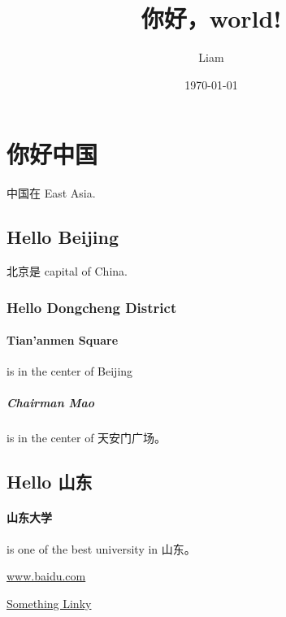\documentclass[UTF8]{ctexart}
\title{你好，world!}
\author{Liam}
\date{\today}
\begin{document}
    \maketitle
    \tableofcontents %
    \section{你好中国}
    中国在 East Asia.
    \subsection{Hello Beijing}
    北京是 capital of China.
    \subsubsection{Hello Dongcheng District}
    \paragraph{Tian'anmen Square}
    is in the center of Beijing
    \subparagraph{Chairman Mao}
    is in the center of 天安门广场。
    \subsection{Hello 山东}
    \paragraph{山东大学} is one of the best university in 山东。

    \url{www.baidu.com}

    \href{http://www.overleaf.com}{Something Linky}
\end{document}
